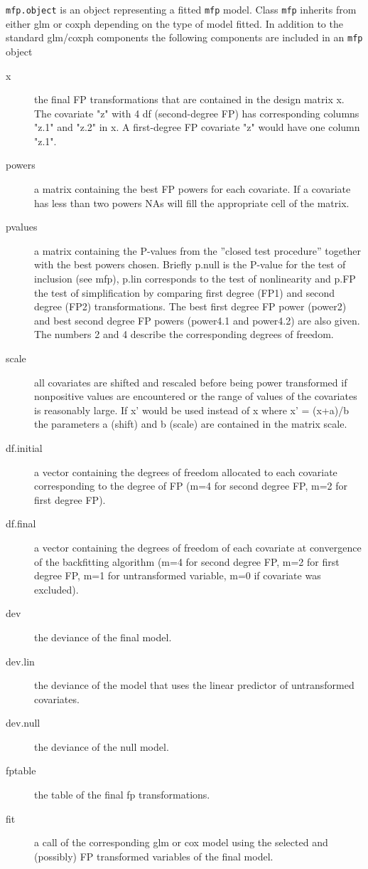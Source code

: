 \documentclass[11pt]{article}
\begin{document}
\texttt{mfp.object} is an object representing a fitted \texttt{mfp} model. 
Class \texttt{mfp} inherits from either glm or coxph depending on the type of model fitted.
In addition to the standard glm/coxph components the following components are included in an 
\texttt{mfp} object
\begin{description}
\item[x]  
the final FP transformations that are contained in the design matrix x. 
The covariate "z" with 4 df (second-degree FP) has corresponding columns "z.1" and "z.2" in x.
A first-degree FP covariate "z" would have one column "z.1".
\item[powers]  
a matrix containing the best FP powers for each covariate. 
If a covariate has less than two powers NAs will fill the appropriate cell of the matrix.
\item[pvalues]     
a matrix containing the P-values from the ''closed test procedure'' together with the best powers chosen. 
Briefly p.null is the P-value for the test of inclusion (see mfp), p.lin corresponds to the 
test of nonlinearity and p.FP the test of simplification by comparing first degree (FP1) and second degree (FP2) transformations. 
The best first degree FP power (power2) and best second degree FP powers (power4.1 and power4.2) are also given. The numbers 2 and 4 describe the corresponding degrees of freedom.
\item[scale]   
all covariates are shifted and rescaled before being power transformed if nonpositive values 
are encountered or the range of values of the covariates is reasonably large. 
If x' would be used instead of x where x' = (x+a)/b the parameters a (shift) and b (scale) 
are contained in the matrix scale.
\item[df.initial]  
a vector containing the degrees of freedom allocated to each covariate corresponding to the degree of FP (m=4 for second degree FP, m=2 for first degree FP).
\item[df.final]    
a vector containing the degrees of freedom of each covariate at convergence of the backfitting 
algorithm (m=4 for second degree FP, m=2 for first degree FP, m=1 for untransformed variable, m=0 if covariate was excluded).
\item[dev]     
the deviance of the final model.
\item[dev.lin]     
the deviance of the model that uses the linear predictor of untransformed  covariates.
\item[dev.null]    
the deviance of the null model.
\item[fptable]     
the table of the final fp transformations.
\item[fit]     
a call of the corresponding glm or cox model using the selected and (possibly) FP  transformed variables of the final model.
\end{description}
\end{document}
